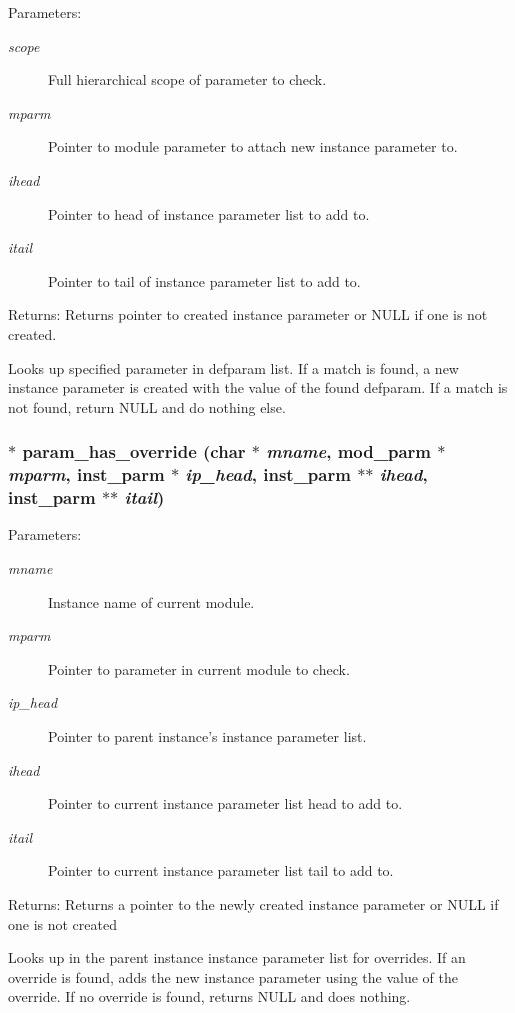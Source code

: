 \begin{Desc}
\item[Parameters:]
\begin{description}
\item[{\em scope}]Full hierarchical scope of parameter to check. \item[{\em mparm}]Pointer to module parameter to attach new instance parameter to. \item[{\em ihead}]Pointer to head of instance parameter list to add to. \item[{\em itail}]Pointer to tail of instance parameter list to add to.\end{description}
\end{Desc}
\begin{Desc}
\item[Returns:]Returns pointer to created instance parameter or NULL if one is not created.\end{Desc}
Looks up specified parameter in defparam list. If a match is found, a new instance parameter is created with the value of the found defparam. If a match is not found, return NULL and do nothing else. 
\subsubsection{$\ast$ param\_\-has\_\-override (char $\ast$ {\em mname}, {\bf mod\_\-parm} $\ast$ {\em mparm}, {\bf inst\_\-parm} $\ast$ {\em ip\_\-head}, {\bf inst\_\-parm} $\ast$$\ast$ {\em ihead}, {\bf inst\_\-parm} $\ast$$\ast$ {\em itail})}\label{param_8c_a15}


\begin{Desc}
\item[Parameters:]
\begin{description}
\item[{\em mname}]Instance name of current module. \item[{\em mparm}]Pointer to parameter in current module to check. \item[{\em ip\_\-head}]Pointer to parent instance's instance parameter list. \item[{\em ihead}]Pointer to current instance parameter list head to add to. \item[{\em itail}]Pointer to current instance parameter list tail to add to.\end{description}
\end{Desc}
\begin{Desc}
\item[Returns:]Returns a pointer to the newly created instance parameter or NULL if one is not created\end{Desc}
Looks up in the parent instance instance parameter list for overrides. If an override is found, adds the new instance parameter using the value of the override. If no override is found, returns NULL and does nothing. 
